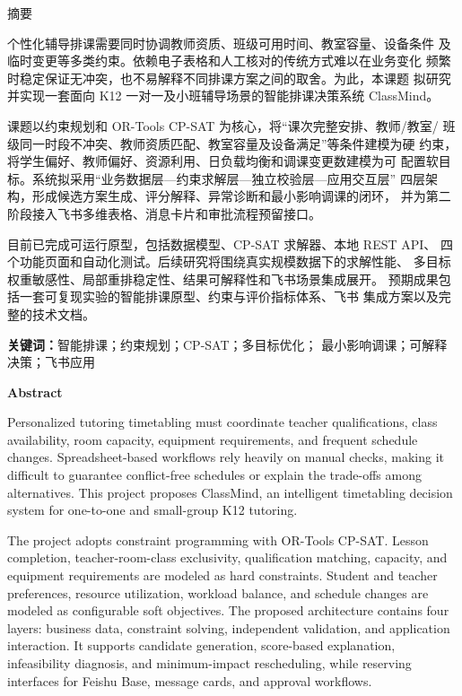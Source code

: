 \clearpage
{}
{}
\begin{center}
  {\heiti{} 摘\quad 要}
\end{center}
\vspace{1.2em}

个性化辅导排课需要同时协调教师资质、班级可用时间、教室容量、设备条件
及临时变更等多类约束。依赖电子表格和人工核对的传统方式难以在业务变化
频繁时稳定保证无冲突，也不易解释不同排课方案之间的取舍。为此，本课题
拟研究并实现一套面向 K12 一对一及小班辅导场景的智能排课决策系统
ClassMind。

课题以约束规划和 OR-Tools CP-SAT 为核心，将“课次完整安排、教师/教室/
班级同一时段不冲突、教师资质匹配、教室容量及设备满足”等条件建模为硬
约束，将学生偏好、教师偏好、资源利用、日负载均衡和调课变更数建模为可
配置软目标。系统拟采用“业务数据层—约束求解层—独立校验层—应用交互层”
四层架构，形成候选方案生成、评分解释、异常诊断和最小影响调课的闭环，
并为第二阶段接入飞书多维表格、消息卡片和审批流程预留接口。

目前已完成可运行原型，包括数据模型、CP-SAT 求解器、本地 REST API、
四个功能页面和自动化测试。后续研究将围绕真实规模数据下的求解性能、
多目标权重敏感性、局部重排稳定性、结果可解释性和飞书场景集成展开。
预期成果包括一套可复现实验的智能排课原型、约束与评价指标体系、飞书
集成方案以及完整的技术文档。

\vspace{1em}
\noindent\textbf{关键词：}智能排课；约束规划；CP-SAT；多目标优化；
最小影响调课；可解释决策；飞书应用

\clearpage
{}
{}
\begin{center}
  {\bfseries{} Abstract}
\end{center}
\vspace{1.2em}

Personalized tutoring timetabling must coordinate teacher qualifications,
class availability, room capacity, equipment requirements, and frequent
schedule changes. Spreadsheet-based workflows rely heavily on manual checks,
making it difficult to guarantee conflict-free schedules or explain the
trade-offs among alternatives. This project proposes ClassMind, an intelligent
timetabling decision system for one-to-one and small-group K12 tutoring.

The project adopts constraint programming with OR-Tools CP-SAT. Lesson
completion, teacher-room-class exclusivity, qualification matching, capacity,
and equipment requirements are modeled as hard constraints. Student and
teacher preferences, resource utilization, workload balance, and schedule
changes are modeled as configurable soft objectives. The proposed architecture
contains four layers: business data, constraint solving, independent
validation, and application interaction. It supports candidate generation,
score-based explanation, infeasibility diagnosis, and minimum-impact
rescheduling, while reserving interfaces for Feishu Base, message cards, and
approval workflows.

